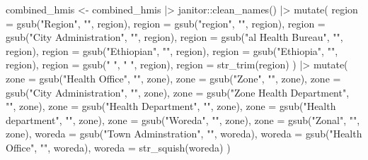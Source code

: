 \documentclass[
  letterpaper,
  DIV=11,
  numbers=noendperiod]{scrartcl}
\newenvironment{Shaded}{\begin{snugshade}}{\end{snugshade}}
\newcommand{\AttributeTok}[1]{\textcolor[rgb]{0.40,0.45,0.13}{#1}}
\newcommand{\FunctionTok}[1]{\textcolor[rgb]{0.28,0.35,0.67}{#1}}
\newcommand{\NormalTok}[1]{\textcolor[rgb]{0.00,0.23,0.31}{#1}}
\newcommand{\OtherTok}[1]{\textcolor[rgb]{0.00,0.23,0.31}{#1}}
\newcommand{\SpecialCharTok}[1]{\textcolor[rgb]{0.37,0.37,0.37}{#1}}
\newcommand{\StringTok}[1]{\textcolor[rgb]{0.13,0.47,0.30}{#1}}
\begin{document}
\begin{Shaded}
\begin{Highlighting}[]
\NormalTok{combined\_hmis }\OtherTok{\textless{}{-}}\NormalTok{ combined\_hmis }\SpecialCharTok{|\textgreater{}}
\NormalTok{  janitor}\SpecialCharTok{::}\FunctionTok{clean\_names}\NormalTok{() }\SpecialCharTok{|\textgreater{}}
  \FunctionTok{mutate}\NormalTok{(}
    \AttributeTok{region =} \FunctionTok{gsub}\NormalTok{(}\StringTok{"Region"}\NormalTok{, }\StringTok{""}\NormalTok{, region),}
    \AttributeTok{region =} \FunctionTok{gsub}\NormalTok{(}\StringTok{"region"}\NormalTok{, }\StringTok{""}\NormalTok{, region),}
    \AttributeTok{region =} \FunctionTok{gsub}\NormalTok{(}\StringTok{"City Administration"}\NormalTok{, }\StringTok{""}\NormalTok{, region),}
    \AttributeTok{region =} \FunctionTok{gsub}\NormalTok{(}\StringTok{"al Health Bureau"}\NormalTok{, }\StringTok{""}\NormalTok{, region),}
    \AttributeTok{region =} \FunctionTok{gsub}\NormalTok{(}\StringTok{"Ethiopian"}\NormalTok{, }\StringTok{""}\NormalTok{, region),}
    \AttributeTok{region =} \FunctionTok{gsub}\NormalTok{(}\StringTok{"Ethiopia"}\NormalTok{, }\StringTok{""}\NormalTok{, region),}
    \AttributeTok{region =} \FunctionTok{gsub}\NormalTok{(}\StringTok{"  "}\NormalTok{, }\StringTok{" "}\NormalTok{, region),}
    \AttributeTok{region =} \FunctionTok{str\_trim}\NormalTok{(region)}
\NormalTok{  ) }\SpecialCharTok{|\textgreater{}}
  \FunctionTok{mutate}\NormalTok{(}
    \AttributeTok{zone =} \FunctionTok{gsub}\NormalTok{(}\StringTok{"Health Office"}\NormalTok{, }\StringTok{""}\NormalTok{, zone),}
    \AttributeTok{zone =} \FunctionTok{gsub}\NormalTok{(}\StringTok{"Zone"}\NormalTok{, }\StringTok{""}\NormalTok{, zone),}
    \AttributeTok{zone =} \FunctionTok{gsub}\NormalTok{(}\StringTok{"City Administration"}\NormalTok{, }\StringTok{""}\NormalTok{, zone),}
    \AttributeTok{zone =} \FunctionTok{gsub}\NormalTok{(}\StringTok{"Zone Health Department"}\NormalTok{, }\StringTok{""}\NormalTok{, zone),}
    \AttributeTok{zone =} \FunctionTok{gsub}\NormalTok{(}\StringTok{"Health Department"}\NormalTok{, }\StringTok{""}\NormalTok{, zone),}
    \AttributeTok{zone =} \FunctionTok{gsub}\NormalTok{(}\StringTok{"Health department"}\NormalTok{, }\StringTok{""}\NormalTok{, zone),}
    \AttributeTok{zone =} \FunctionTok{gsub}\NormalTok{(}\StringTok{"Woreda"}\NormalTok{, }\StringTok{""}\NormalTok{, zone),}
    \AttributeTok{zone =} \FunctionTok{gsub}\NormalTok{(}\StringTok{"Zonal"}\NormalTok{, }\StringTok{""}\NormalTok{, zone),}
    \AttributeTok{woreda =} \FunctionTok{gsub}\NormalTok{(}\StringTok{"Town Adminstration"}\NormalTok{, }\StringTok{""}\NormalTok{, woreda),}
    \AttributeTok{woreda =} \FunctionTok{gsub}\NormalTok{(}\StringTok{"Health Office"}\NormalTok{, }\StringTok{""}\NormalTok{, woreda),}
    \AttributeTok{woreda =} \FunctionTok{str\_squish}\NormalTok{(woreda)}
\NormalTok{  )}
\end{Highlighting}
\end{Shaded}
\end{document}
